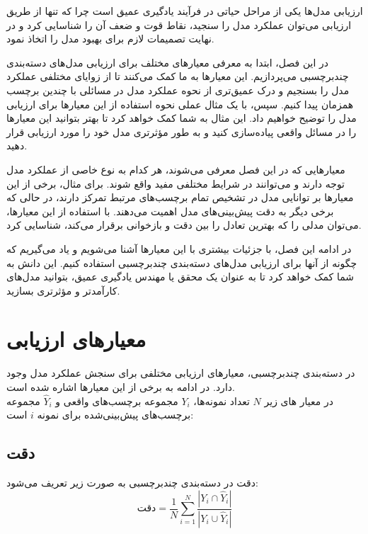 
ارزیابی مدل‌ها یکی از مراحل حیاتی در فرآیند یادگیری عمیق است چرا که تنها از طریق ارزیابی می‌توان عملکرد مدل را سنجید، نقاط قوت و ضعف آن را شناسایی کرد و در نهایت تصمیمات لازم برای بهبود مدل را اتخاذ نمود.

در این فصل، ابتدا به معرفی معیارهای مختلف برای ارزیابی مدل‌های دسته‌بندی چندبرچسبی می‌پردازیم. این معیارها به ما کمک می‌کنند تا از زوایای مختلفی عملکرد مدل را بسنجیم و درک عمیق‌تری از نحوه عملکرد مدل در مسائلی با چندین برچسب همزمان پیدا کنیم. سپس، با یک مثال عملی نحوه استفاده از این معیارها برای ارزیابی مدل را توضیح خواهیم داد. این مثال به شما کمک خواهد کرد تا بهتر بتوانید این معیارها را در مسائل واقعی پیاده‌سازی کنید و به طور مؤثرتری مدل خود را مورد ارزیابی قرار دهید.

معیارهایی که در این فصل معرفی می‌شوند، هر کدام به نوع خاصی از عملکرد مدل توجه دارند و می‌توانند در شرایط مختلفی مفید واقع شوند. برای مثال، برخی از این معیارها بر توانایی مدل در تشخیص تمام برچسب‌های مرتبط تمرکز دارند، در حالی که برخی دیگر به دقت پیش‌بینی‌های مدل اهمیت می‌دهند. با استفاده از این معیارها، می‌توان مدلی را که بهترین تعادل را بین دقت و بازخوانی برقرار می‌کند، شناسایی کرد.

در ادامه این فصل، با جزئیات بیشتری با این معیارها آشنا می‌شویم و یاد می‌گیریم که چگونه از آنها برای ارزیابی مدل‌های دسته‌بندی چندبرچسبی استفاده کنیم. این دانش به شما کمک خواهد کرد تا به عنوان یک محقق یا مهندس یادگیری عمیق، بتوانید مدل‌های کارآمدتر و مؤثرتری بسازید.
\section{معیارهای ارزیابی}

در دسته‌بندی چندبرچسبی، معیارهای ارزیابی مختلفی برای سنجش عملکرد مدل وجود دارد. در ادامه به برخی از این معیارها اشاره شده است.
\\
در معیار های زیر $N$ تعداد نمونه‌ها، $Y_i$ مجموعه برچسب‌های واقعی و $\hat{Y}_i$ مجموعه برچسب‌های پیش‌بینی‌شده برای نمونه $i$ است:


\subsection{دقت \protect{}}

دقت در دسته‌بندی چندبرچسبی به صورت زیر تعریف می‌شود:
\cite{evaluationMetric}
\begin{equation}
	\text{دقت} = \frac{1}{N} \sum_{i=1}^{N} \frac{|Y_i \cap \hat{Y}_i|}{|Y_i \cup \hat{Y}_i|}
	\label{eq:accuracy}
\end{equation}
